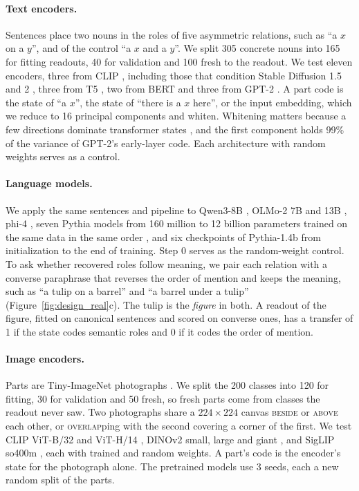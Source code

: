\documentclass[10pt]{article}
\theoremstyle{plain}
\theoremstyle{remark}
\begin{document}
\paragraph{Text encoders.} Sentences place two nouns in the roles of five asymmetric relations, such as ``a $x$ on a $y$'', and of the control ``a $x$ and a $y$''. We split 305 concrete nouns into 165 for fitting readouts, 40 for validation and 100 fresh to the readout. We test eleven encoders, three from CLIP \citep{radford2021clip}, including those that condition Stable Diffusion 1.5 and 2 \citep{rombach2022}, three from T5 \citep{raffel2020t5}, two from BERT \citep{devlin2019bert} and three from GPT-2 \citep{radford2019gpt2}. A part code is the state of ``a $x$'', the state of ``there is a $x$ here'', or the input embedding, which we reduce to 16 principal components and whiten. Whitening matters because a few directions dominate transformer states \citep{ethayarajh2019,timkey2021}, and the first component holds 99\% of the variance of GPT-2's early-layer code. Each architecture with random weights serves as a control.

\paragraph{Language models.} We apply the same sentences and pipeline to Qwen3-8B \citep{yang2025qwen3}, OLMo-2 7B and 13B \citep{olmo2024olmo2}, phi-4 \citep{abdin2024phi4}, seven Pythia models from 160 million to 12 billion parameters trained on the same data in the same order \citep{biderman2023pythia}, and six checkpoints of Pythia-1.4b from initialization to the end of training. Step 0 serves as the random-weight control. To ask whether recovered roles follow meaning, we pair each relation with a converse paraphrase that reverses the order of mention and keeps the meaning, such as ``a tulip on a barrel'' and ``a barrel under a tulip'' (Figure~\ref{fig:design_real}c). The tulip is the \emph{figure} in both. A readout of the figure, fitted on canonical sentences and scored on converse ones, has a transfer of 1 if the state codes semantic roles and 0 if it codes the order of mention.

\paragraph{Image encoders.} Parts are Tiny-ImageNet photographs \citep{le2015tiny}. We split the 200 classes into 120 for fitting, 30 for validation and 50 fresh, so fresh parts come from classes the readout never saw. Two photographs share a $224 \times 224$ canvas \textsc{beside} or \textsc{above} each other, or \textsc{overlap}ping with the second covering a corner of the first. We test CLIP ViT-B/32 and ViT-H/14 \citep{radford2021clip,cherti2023}, DINOv2 small, large and giant \citep{oquab2024dinov2}, and SigLIP so400m \citep{zhai2023siglip}, each with trained and random weights. A part's code is the encoder's state for the photograph alone. The pretrained models use 3 seeds, each a new random split of the parts.
\end{document}
